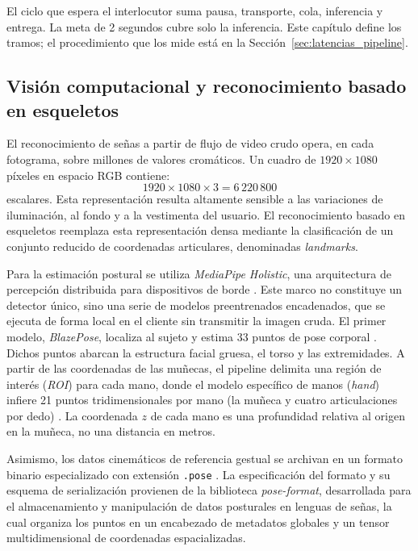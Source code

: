 El ciclo que espera el interlocutor suma pausa, transporte, cola, inferencia y entrega. La meta de 2 segundos cubre solo la inferencia. Este capítulo define los tramos; el procedimiento que los mide está en la Sección~\ref{sec:latencias_pipeline}.

\subsection{Visión computacional y reconocimiento basado en esqueletos}
El reconocimiento de señas a partir de flujo de video crudo opera, en cada fotograma, sobre millones de valores cromáticos. Un cuadro de $1920 \times 1080$ píxeles en espacio RGB contiene:
\begin{equation}
1920 \times 1080 \times 3 = 6\,220\,800
\label{eq:escalares_rgb}
\end{equation}
escalares. Esta representación resulta altamente sensible a las variaciones de iluminación, al fondo y a la vestimenta del usuario. El reconocimiento basado en esqueletos reemplaza esta representación densa mediante la clasificación de un conjunto reducido de coordenadas articulares, denominadas \textit{landmarks}.

Para la estimación postural se utiliza \textit{MediaPipe Holistic}, una arquitectura de percepción distribuida para dispositivos de borde \parencite{google2019mediapipe}. Este marco no constituye un detector único, sino una serie de modelos preentrenados encadenados, que se ejecuta de forma local en el cliente sin transmitir la imagen cruda. El primer modelo, \textit{BlazePose}, localiza al sujeto y estima 33 puntos de pose corporal \parencite{bazarevsky2020blazepose}. Dichos puntos abarcan la estructura facial gruesa, el torso y las extremidades. A partir de las coordenadas de las muñecas, el pipeline delimita una región de interés (\textit{ROI}) para cada mano, donde el modelo específico de manos (\textit{hand}) infiere 21 puntos tridimensionales por mano (la muñeca y cuatro articulaciones por dedo) \parencite{zhang2020mediapipehands}. La coordenada $z$ de cada mano es una profundidad relativa al origen en la muñeca, no una distancia en metros.

Asimismo, los datos cinemáticos de referencia gestual se archivan en un formato binario especializado con extensión \texttt{.pose} \parencite{moryossef2021poseformat}. La especificación del formato y su esquema de serialización provienen de la biblioteca \textit{pose-format}, desarrollada para el almacenamiento y manipulación de datos posturales en lenguas de señas, la cual organiza los puntos en un encabezado de metadatos globales y un tensor multidimensional de coordenadas espacializadas.

